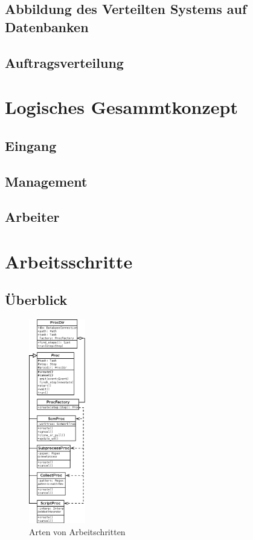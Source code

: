 \subsection{Abbildung des Verteilten Systems auf Datenbanken}




\subsection{Auftragsverteilung}

\section{Logisches Gesammtkonzept}
\subsection{Eingang}
\subsection{Management}
\subsection{Arbeiter}

\section{Arbeitsschritte}

\subsection{\"Uberblick}


\begin{figure}[h!]
  \centering
  \label{fig:klassen-arten-arbeitsschritt}
  \includegraphics[height=3.5in]{imageinput/klassen-arten-arbeitsschritt.png}
  \caption{Arten von Arbeitschritten}
\end{figure}


